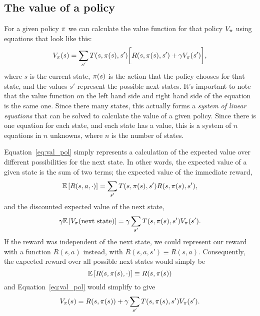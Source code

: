 \documentclass[a4paper]{article}
\begin{document}
\subsection{The value of a policy} \label{ssec:val_pol}
For a given policy $\pi$ we can calculate the value function for
that policy $V_\pi$ using equations that look like this:
\begin{equation} \label{eq:val_pol}
  V_\pi(s) = \sum_{s'} T(s, \pi(s), s') \bigg[ R(s, \pi(s), s') + \gamma V_\pi(s') \bigg] ,
\end{equation}
where $s$ is the current state, $\pi(s)$ is the action that the policy
chooses for that state, and the values $s'$ represent the possible next states.
It's important to note that the value function on the left hand side and right
hand side of the equation is the same one.
Since there many states,
this actually forms a \emph{system of linear equations} that can be solved to
calculate the value of a given policy.
Since there is one equation for each state, and each state has a value,
this is a system of $n$ equations in $n$ unknowns, where $n$ is the number of
states.

Equation~\ref{eq:val_pol} simply represents a calculation of the expected value
over different possibilities for the next state.
In other words, the expected value of a given state is the sum of two terms;
the expected value of the immediate reward,
\begin{equation} \label{eq:e_rew}
  \mathbb{E} \left[{R(s, a, \cdot)}\right] = \sum_{s'} T(s, \pi(s), s') R(s, \pi(s), s') ,
\end{equation}
and the discounted expected value of the next state,
\begin{equation}
  \gamma \mathbb{E} \left[{V_{\pi}(\text{next state})}\right] = \gamma \sum_{s'} T(s, \pi(s), s') V_\pi(s') .
\end{equation}
If the reward was independent of the next state, we could represent
our reward with a function $R(s, a)$ instead,
with $R(s, a, s') \equiv R(s, a)$.
Consequently, the expected reward over all possible next states
would simply be
\begin{equation*}
  \mathbb{E} \left[{R(s, \pi(s), \cdot)}\right] \equiv R(s, \pi(s))
\end{equation*}
and Equation~\ref{eq:val_pol} would
simplify to give
\begin{equation} \label{eq:val_rsa}
  V_\pi(s) = R(s, \pi(s)) + \gamma \sum_{s'} T(s, \pi(s), s') V_\pi(s') .
\end{equation}
\end{document}
